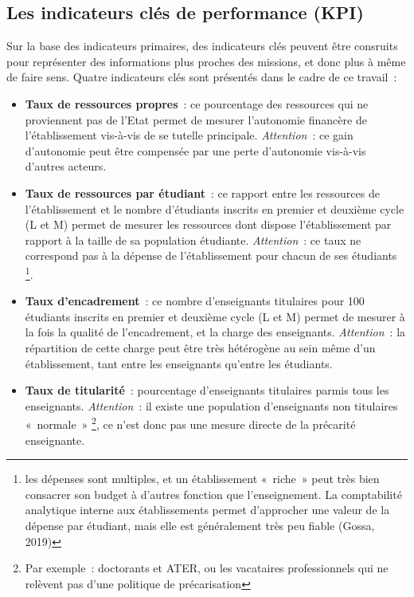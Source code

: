\documentclass[12pt,french,landscape]{article}
\providecommand{\tightlist}{%
  \setlength{\itemsep}{0pt}\setlength{\parskip}{0pt}}
\begin{document}
\begin{multicols}{2}
\hypertarget{les-indicateurs-cluxe9s-de-performance-kpi}{%
\subsection{Les indicateurs clés de performance
(KPI)}\label{les-indicateurs-cluxe9s-de-performance-kpi}}

Sur la base des indicateurs primaires, des indicateurs clés peuvent être
consruits pour représenter des informations plus proches des missions,
et donc plus à même de faire sens. Quatre indicateurs clés sont
présentés dans le cadre de ce travail~:

\begin{itemize}
\tightlist
\item
  \textbf{Taux de ressources propres}~: ce pourcentage des ressources
  qui ne proviennent pas de l'Etat permet de mesurer l'autonomie
  financère de l'établissement vis-à-vis de se tutelle principale.
  \emph{Attention}~: ce gain d'autonomie peut être compensée par une
  perte d'autonomie vis-à-vis d'autres acteurs.
\item
  \textbf{Taux de ressources par étudiant}~: ce rapport entre les
  ressources de l'établissement et le nombre d'étudiants inscrits en
  premier et deuxième cycle (L et M) permet de mesurer les ressources
  dont dispose l'établissement par rapport à la taille de sa population
  étudiante. \emph{Attention}~: ce taux ne correspond pas à la dépense
  de l'établissement pour chacun de ses étudiants \footnote{les dépenses
    sont multiples, et un établissement «~riche~» peut très bien
    consacrer son budget à d'autres fonction que l'enseignement. La
    comptabilité analytique interne aux établissements permet
    d'approcher une valeur de la dépense par étudiant, mais elle est
    généralement très peu fiable (Gossa, 2019)}.
\item
  \textbf{Taux d'encadrement}~: ce nombre d'enseignants titulaires pour
  100 étudiants inscrits en premier et deuxième cycle (L et M) permet de
  mesurer à la fois la qualité de l'encadrement, et la charge des
  enseignants. \emph{Attention}~: la répartition de cette charge peut
  être très hétérogène au sein même d'un établissement, tant entre les
  enseignants qu'entre les étudiants.
\item
  \textbf{Taux de titularité}~: pourcentage d'enseignants titulaires
  parmis tous les enseignants. \emph{Attention}~: il existe une
  population d'enseignants non titulaires «~normale~» \footnote{Par
    exemple~: doctorants et ATER, ou les vacataires professionnels qui
    ne relèvent pas d'une politique de précarisation}, ce n'est donc pas
  une mesure directe de la précarité enseignante.
\end{itemize}


\end{multicols}
\end{document}
